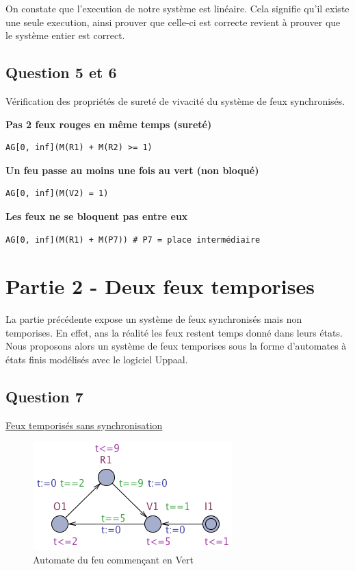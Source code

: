 \documentclass[11pt]{article}
\begin{document}
On constate que l'execution de notre système est linéaire. Cela signifie qu'il existe une seule execution, ainsi prouver que celle-ci est correcte revient à prouver que le système entier est correct.

\subsection{Question 5 et 6}

Vérification des propriétés de sureté de vivacité du système de feux synchronisés.

\textbf{Pas 2 feux rouges en même temps (sureté)}
\begin{verbatim}
AG[0, inf](M(R1) + M(R2) >= 1)	
\end{verbatim}

\textbf{Un feu passe au moins une fois au vert (non bloqué)}
\begin{verbatim}
AG[0, inf](M(V2) = 1)	
\end{verbatim}
	
\textbf{Les feux ne se bloquent pas entre eux}
\begin{verbatim}
AG[0, inf](M(R1) + M(P7)) # P7 = place intermédiaire	
\end{verbatim}

\section{Partie 2 - Deux feux temporises}
La partie précédente expose un système de feux synchronisés mais non temporises. En effet, ans la réalité les feux restent temps donné dans leurs états. Nous proposons alors un système de feux temporises sous la forme d'automates à états finis modélisés avec le logiciel Uppaal.

\subsection{Question 7}

\href{https://github.com/masters-info-nantes/hong-cheng-lv/blob/master/ressources/part2/Q7-FeuxTemporises.xml}{Feux temporisés sans synchronisation}

\begin{figure}[H]
	\centering
	\includegraphics{ressources/part2/Q7-1.png}
	\caption{Automate du feu commençant en Vert}
\end{figure}
\end{document}
